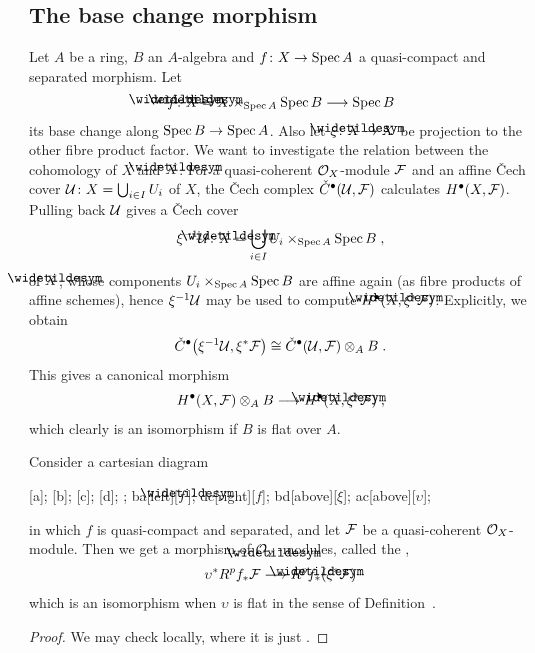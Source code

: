 \documentclass[a4paper,parskip=half,numbers=enddot, DIV=12]{scrreprt}
\begin{document}
\subsection{The base change morphism}
Let $A$ be a ring, $B$ an $A$-algebra and $f\colon X\morphism \Spec A$ a quasi-compact and separated morphism. Let 
\begin{align*}
	\snake{f}\colon\snake{X}=X\times_{\Spec A}\Spec B\morphism\Spec B%
\end{align*}
its base change along $\Spec B\morphism\Spec A$. Also let $\xi\colon \snake{X}\morphism X$ be projection to the other fibre product factor. We want to investigate the relation between the cohomology of $X$ and $\snake{X}$. For a quasi-coherent $\mathcal{O}_X$-module $\mathcal{F}$ and an affine \v Cech cover $\mathcal{U}\colon X=\bigcup_{i\in I}U_i$ of $X$, the \v Cech complex $\check{C}^\bullet(\mathcal{U},\mathcal{F})$ calculates $H^\bullet(X,\mathcal{F})$. Pulling back $\mathcal{U}$ gives a \v Cech cover
\begin{align*}
	\xi^{-1}\Uu\colon \snake{X}=\bigcup_{i\in I}U_i\times_{\Spec A}\Spec B\;,
\end{align*}
of $\snake{X}$, whose components $U_i\times_{\operatorname{Spec} A}\operatorname{Spec} B$ are affine again (as fibre products of affine schemes), hence $\xi^{-1}\mathcal{U}$ may be used to compute $H^\bullet(\snake{X},\xi^*\Ff)$. Explicitly, we obtain
\begin{align}\lbl{eq:tensoredCechComplex}
	\check{C}^\bullet\big(\xi^{-1}\Uu,\xi^*\Ff\big)\cong \check{C}^\bullet(\Uu,\Ff)\otimes_AB\;.
\end{align}
This gives a canonical morphism
\begin{align}\lbl{eq:tensoredCohomology}
	H^\bullet(X,\Ff)\otimes_AB\morphism H^\bullet(\snake{X},\xi^*\Ff)\;,
\end{align}
which clearly is an isomorphism if $B$ is flat over $A$.
\begin{prop}
	Consider a cartesian diagram
	\begin{diagram*}
		[a];
		[b];
		[c];
		[d];
		;
		\scriptsize
		\arrow ba[left][$\snake{f}$];
		\arrow dc[right][$f$];
		\arrow bd[above][$\xi$];
		\arrow ac[above][$\upsilon$];
	\end{diagram*}
	in which $f$ is quasi-compact and separated, and let $\mathcal{F}$ be a quasi-coherent $\mathcal{O}_X$-module. Then we get a morphism of $\Oo_{\snake{Y}}$-modules, called the ,
	\begin{align}\lbl{eq:baseChangeMorphism}
		\upsilon^*R^pf_*\Ff\morphism R^p\snake{f}_*(\xi^*\Ff)
	\end{align}
	which is an isomorphism when $\upsilon$ is flat in the sense of Definition~.
\end{prop}
\begin{proof}
	We may check  locally, where it is just .
\end{proof}
\end{document}
